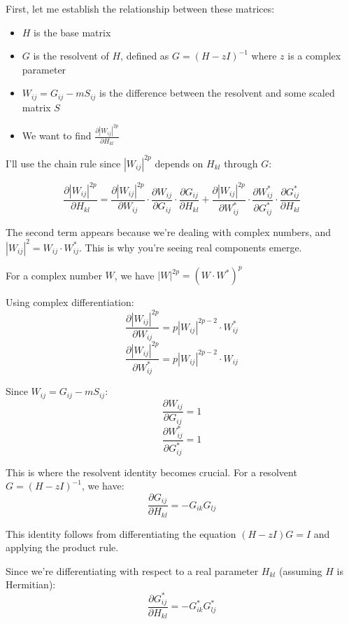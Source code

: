 \documentclass[11pt]{article}
\begin{document}
First, let me establish the relationship between these matrices:
\begin{itemize}
    \item $H$ is the base matrix
    \item $G$ is the resolvent of $H$, defined as $G = (H - zI)^{-1}$ where $z$ is a complex parameter
    \item $W_{ij} = G_{ij} - mS_{ij}$ is the difference between the resolvent and some scaled matrix $S$
    \item We want to find $\frac{\partial|W_{ij}|^{2p}}{\partial H_{kl}}$
\end{itemize}



I'll use the chain rule since $|W_{ij}|^{2p}$ depends on $H_{kl}$ through $G$:

$$\frac{\partial |W_{ij}|^{2p}}{\partial H_{kl}} = \frac{\partial |W_{ij}|^{2p}}{\partial W_{ij}} \cdot \frac{\partial W_{ij}}{\partial G_{ij}} \cdot \frac{\partial G_{ij}}{\partial H_{kl}} + \frac{\partial |W_{ij}|^{2p}}{\partial W_{ij}^*} \cdot \frac{\partial W_{ij}^*}{\partial G_{ij}^*} \cdot \frac{\partial G_{ij}^*}{\partial H_{kl}}$$

The second term appears because we're dealing with complex numbers, and $|W_{ij}|^2 = W_{ij} \cdot W_{ij}^*$. This is why you're seeing real components emerge.



For a complex number $W$, we have $|W|^{2p} = (W \cdot W^*)^p$

Using complex differentiation:
$$\frac{\partial |W_{ij}|^{2p}}{\partial W_{ij}} = p|W_{ij}|^{2p-2} \cdot W_{ij}^*$$
$$\frac{\partial |W_{ij}|^{2p}}{\partial W_{ij}^*} = p|W_{ij}|^{2p-2} \cdot W_{ij}$$


Since $W_{ij} = G_{ij} - mS_{ij}$:
$$\frac{\partial W_{ij}}{\partial G_{ij}} = 1$$
$$\frac{\partial W_{ij}^*}{\partial G_{ij}^*} = 1$$



This is where the resolvent identity becomes crucial. For a resolvent $G = (H-zI)^{-1}$, we have:
$$\frac{\partial G_{ij}}{\partial H_{kl}} = -G_{ik}G_{lj}$$

This identity follows from differentiating the equation $(H-zI)G = I$ and applying the product rule.



Since we're differentiating with respect to a real parameter $H_{kl}$ (assuming $H$ is Hermitian):
$$\frac{\partial G_{ij}^*}{\partial H_{kl}} = -G_{ik}^*G_{lj}^*$$
\end{document}
